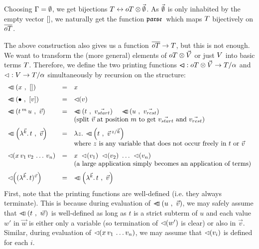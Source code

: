 \documentclass[submission,copyright,creativecommons]{eptcs}
\begin{document}
Choosing $\Gamma = \emptyset$, we get bijections $T \leftrightarrow oT \otimes {\vec {\emptyset}}$. As $\vec {\emptyset}$ is only inhabited by the empty vector $[]$, we naturally get the 
function $\mathfrak {parse } \,$ which maps $T$ bijectively on $\overline{oT}$.



The above construction also gives us a function $\overline{oT} \rightarrow T$, but this is not enough. We want to transform the (more general) elements of $oT \otimes \vec {V}$ or just $V$ into basic terms $T$.
Therefore, we
define the two printing functions $\lhd \hspace{-8pt} \lhd : oT \otimes \vec {V} \rightarrow T / \alpha$ and $\mathord{\lhd} : V \rightarrow T / \alpha$ simultaneously by recursion on the structure:
\[
\begin{array}{lcl}
\medskip
\pr{x}{\emptyVec} & = & x \\
\medskip
\pr{\ovar}{[v]} & = & \prVal v \\
\pr{t \oapp m u}{\vec v} & = & \ApA {\pr {t}{\vec{v_{start}}}  }  {\quad \pr {u}{\vec{v_{rest}}}} \\
\medskip
&& \mbox{(split $\vec v$ at position $m$ to get $\vec{v_{start}}$ and $\vec{v_{rest}}$)} \\
\pr{\LaO {\vec k} t}{\vec v} & = & \LaA z {\pr {t} {  \multiinsert{\vec v}{\vec k}{z}   }}   \\
\medskip
&& \mbox{where $z$ is any variable that does not occur freely in $t$ or $\vec v$ } \\
\prVal{x \sspace v_1 \sspace v_2 \sspace \ldots \sspace v_n} & = & x \ \prVal{v_1} \ \prVal{v_2} \ \ldots \ \prVal{v_n} \\
\medskip && \mbox{(a large application simply becomes an application of terms)} \\
\prVal{\Val {\vec k} t {\vec v}} & = & \pr{\LaO {\vec k} t}{\vec v} \\
\end{array}
\]
First, note that the printing functions are well-defined (i.e. they always terminate). This is because during evaluation of $\lhd \hspace{-8pt} \lhd \left( u \ , \ \vec v \right)$, we may safely assume that $\lhd \hspace{-8pt} \lhd \left( t \ , \ \vec w \right)$ is well-defined as long as $t$ is a strict subterm of $u$ and each value $w'$ in $\vec w$ is either only a variable (so termination of $\lhd \hspace{-2pt} \left( w' \right)$ is clear) or also in $\vec v$. Similar, during evaluation of $\lhd \hspace{-2pt} \left( x \, v_1 \, \ldots v_n \right)$, we may assume that $\lhd \hspace{-2pt} \left( v_i \right)$ is defined for each $i$.
\end{document}
